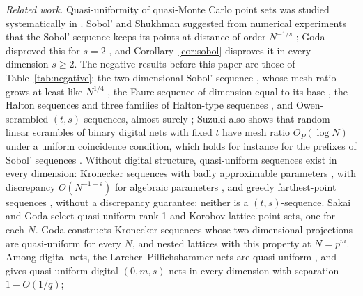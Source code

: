 \emph{Related work.} Quasi-uniformity of quasi-Monte Carlo point sets was studied systematically in \cite{DGLPS1,DGS2}. Sobol' and Shukhman suggested from numerical experiments that the Sobol' sequence keeps its points at distance of order $N^{-1/s}$ \cite{SS07}; Goda disproved this for $s=2$ \cite{Goda23}, and Corollary~\ref{cor:sobol} disproves it in every dimension $s\ge2$. The negative results before this paper are those of Table~\ref{tab:negative}: the two-dimensional Sobol' sequence \cite{Goda23}, whose mesh ratio grows at least like $N^{1/4}$ \cite{Suz25}, the Faure sequence of dimension equal to its base \cite{DGS2}, the Halton sequences and three families of Halton-type sequences \cite{GHS26}, and Owen-scrambled $(t,s)$-sequences, almost surely \cite{Suz26}; Suzuki also shows that random linear scrambles of binary digital nets with fixed $t$ have mesh ratio $O_P(\log N)$ under a uniform coincidence condition, which holds for instance for the prefixes of Sobol' sequences \cite[Thm.~5.5, Lem.~4.10]{Suz26}. Without digital structure, quasi-uniform sequences exist in every dimension: Kronecker sequences with badly approximable parameters \cite[Thm.~3.9]{DGLPS1}, with discrepancy $O(N^{-1+\varepsilon})$ for algebraic parameters \cite[Section~3.3]{DGLPS1}, and greedy farthest-point sequences \cite{PZ23,GX26}, without a discrepancy guarantee; neither is a $(t,s)$-sequence. Sakai and Goda \cite{SG26} select quasi-uniform rank-1 and Korobov lattice point sets, one for each $N$. Goda \cite{Goda26} constructs Kronecker sequences whose two-dimensional projections are quasi-uniform for every $N$, and nested lattices with this property at $N=p^m$. Among digital nets, the Larcher--Pillichshammer nets are quasi-uniform \cite{LP01,DGS2}, and \cite{Gru26geo} gives quasi-uniform digital $(0,m,s)$-nets in every dimension with separation $1-O(1/q)$; %
